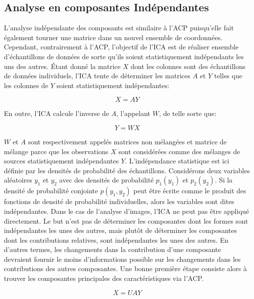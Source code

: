 \documentclass[runningheads]{llncs}
\begin{document}
\subsection{Analyse en composantes Indépendantes}
L'analyse indépendante des composants est similaire à l'ACP puisqu'elle fait également tourner une matrice dans un nouvel ensemble de coordonnées. Cependant, contrairement à l'ACP, l'objectif de l'ICA est de réaliser ensemble d'échantillons de données de sorte qu'ils soient statistiquement indépendants les uns des autres. Étant donné la matrice $X$ dont les colonnes sont des échantillons de données individuels, l'ICA tente de déterminer les matrices $A$ et $Y$ telles que les colonnes de $Y$ soient statistiquement indépendantes:

\begin{equation}
X = AY
\end{equation}

En outre, l'ICA calcule l'inverse de $A$, l'appelant $W$, de telle sorte que:

\begin{equation}
Y = WX
\end{equation}

$W$ et $A$ sont respectivement appelés matrices non mélangées et matrice de mélange parce que les observations $X$ sont considérées comme des mélanges de sources statistiquement indépendantes $Y$. L'indépendance statistique est ici définie par les densités de probabilité des échantillons. Considérons deux variables aléatoires $y_1$ et $y_2$ avec des densités de probabilité $p_1(y_1)$ et $p_2(y_2)$. Si la densité de probabilité conjointe $p(y_1, y_2)$ peut être écrite comme le produit des fonctions de densité de probabilité individuelles, alors les variables sont dites indépendantes.
Dans le cas de l'analyse d'images, l'ICA ne peut pas être appliqué directement. Le but n'est pas de déterminer les composantes dont les formes sont indépendantes les unes des autres, mais plutôt de déterminer les composantes dont les contributions relatives, sont indépendantes les unes des autres. En d'autres termes, les changements dans la contribution d'une composante devraient fournir le moins d'informations possible sur les changements dans les contributions des autres composantes. Une bonne première étape consiste alors à trouver les composantes principales des caractéristiques via l'ACP.

\begin{equation}
X = UAY
\end{equation}
\end{document}
